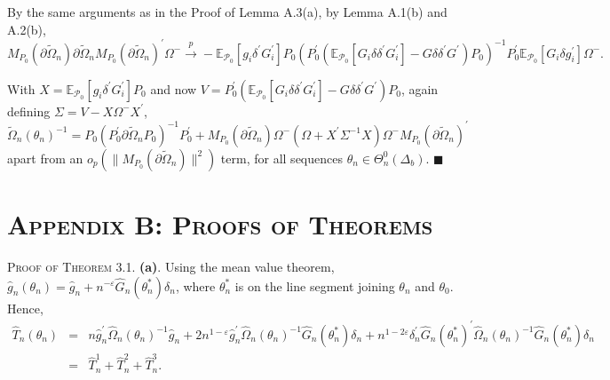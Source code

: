 \documentclass[hidelinks, 11 pt, a4paper, pdflatex]{article}
\renewcommand{\theequation}{\arabic{section}.\arabic{equation}}
\begin{document}
{    By the same arguments as in the Proof of Lemma A.3(a), by Lemma A.1(b) and A.2(b),
     \[
      M_{P_{0}}(\partial \tilde{\Omega}_{n})\partial \tilde{\Omega}_{n}M_{P_{0}}(\partial \tilde{\Omega}_{n})^{\prime}\Omega ^{-}
      \overset{p} {\rightarrow}
       - \mathbb{E}_{\mathcal{P}_{0}}[g_{i}\delta^{\prime }G_{i}^{\prime}]
         P_{0}(
          P_{0}^{\prime}(\mathbb{E}_{\mathcal{P}_{0}}[G_{i}\delta \delta^{\prime}G_{i}^{\prime}] - G\delta \delta^{\prime}G^{\prime})
         P_{0})^{-1}
         P_{0}^{\prime}\mathbb{E}_{\mathcal{P}_{0}}[G_{i}\delta g_{i}^{\prime}]\Omega ^{-}.
     \]

    With $X = \mathbb{E}_{\mathcal{P}_{0}}[g_{i}\delta^{\prime}G_{i}^{\prime}]P_{0}$ and now $V = P_{0}^{\prime}(\mathbb{E}_{\mathcal{P}_{0}}[G_{i}\delta \delta^{\prime}G_{i}^{\prime}] - G\delta \delta^{\prime}G^{\prime})P_{0}$, again defining $\Sigma = V - X\Omega^{-}X^{\prime}$,
     \[
      \tilde{\Omega}_{n}(\theta _{n})^{-1} = P_{0}(P_{0}^{\prime}\partial \tilde{\Omega}_{n}P_{0})^{-1}P_{0}^{\prime}
                                             + M_{P_{0}}(\partial \tilde{\Omega}_{n})\Omega^{-}
                                                (\Omega + X^{\prime}\Sigma^{-1}X)
                                               \Omega^{-}M_{P_{0}}(\partial \tilde{\Omega}_{n})^{\prime}
     \]
    apart from an $o_{p}(\|M_{P_{0}}(\partial \tilde{\Omega}_{n})\|^{2})$ term, for all sequences $\theta_{n} \in \Theta_{n}^{0}(\Delta_{b})$. $\blacksquare $

 \renewcommand{\thesection}{}

 \section{\textsc{Appendix B: Proofs of Theorems}}

  \setcounter{equation}{0}
  \renewcommand{\theequation}{B.\arabic{equation}}
  \renewcommand{\thesection}{B}

  \textsc{Proof of Theorem 3.1}. \textbf{(a)}. Using the mean value theorem, $\hat{g}_{n}(\theta_{n}) = \hat{g}_{n} +
   n^{-\varepsilon}\hat{G}_{n}(\theta_{n}^{\ast})\delta_{n}$, where $\theta_{n}^{\ast}$ is on the line segment joining $\theta_{n}$ and $\theta_{0}$. Hence,
    \begin{eqnarray*}
     \hat{T}_{n}(\theta_{n}) & = & n\hat{g}_{n}^{\prime}\hat{\Omega}_{n}(\theta_{n})^{-1}\hat{g}_{n}
                                   + 2n^{1-\varepsilon}\hat{g}_{n}^{\prime}\hat{\Omega}_{n}(\theta_{n})^{-1}\hat{G}_{n}(\theta_{n}^{\ast})\delta_{n}
                                   + n^{1-2\varepsilon}\delta_{n}^{\prime}\hat{G}_{n}(\theta_{n}^{\ast})^{\prime}\hat{\Omega}_{n}(\theta_{n})^{-1}
                                      \hat{G}_{n}(\theta_{n}^{\ast})\delta_{n} \\
                            & = & \hat{T}_{n}^{1} + \hat{T}_{n}^{2} + \hat{T}_{n}^{3}.
    \end{eqnarray*}

}
\end{document}
